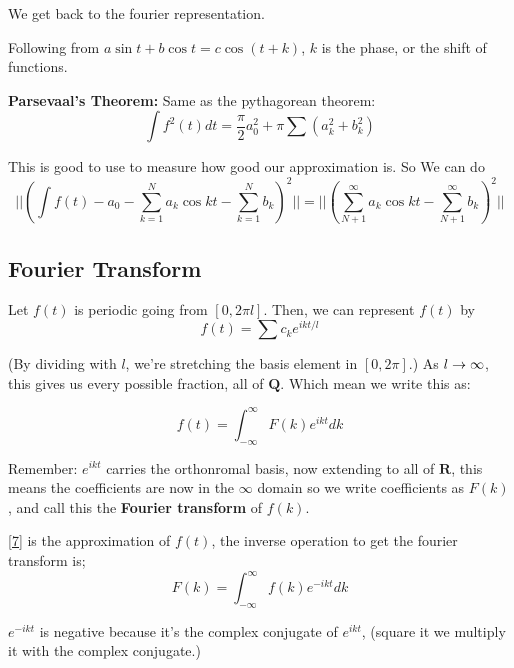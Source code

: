 We get back to the fourier representation.

Following from $a \sin t + b \cos t = c \cos (t + k)$, $k$ is the phase, or the shift
of functions.

\textbf{Parsevaal's Theorem:} Same as the pythagorean theorem:
$$\int f^2(t) dt = \frac{\pi}{2}a_0^2 + \pi\sum (a_k^2 + b_k^2)$$

This is good to use to measure how good our approximation is. 
So  
We can do $$
||(\int f(t) - a_0 -\sum_{k=1}^N a_k \cos kt - \sum_{k=1}^N
b_k)^2||  = ||(\sum_{N+1}^\infty a_k \cos kt - \sum_{N+1}^\infty b_k )^2||$$


\subsection{Fourier Transform}
\label{sec:fourier-transform-1}
Let $f(t)$ is periodic going from $[0, 2\pi l]$. Then, we can
represent $f(t)$ by
$$
  f(t)= \sum c_k e^{ikt/ l}
$$

(By dividing with $l$, we're stretching the basis element in $[0,
2\pi]$.) As $l\rightarrow \infty$, this gives us every possible fraction,
all of $\mathbf{Q}$. Which mean we write this as:

\begin{equation}
  \label{eq:7}
  f(t)= \int_{-\infty}^\infty F(k)e^{ikt}dk
\end{equation}

Remember: $e^{ikt}$ carries the orthonromal basis, now extending to
all of $\mathbf{R}$, this means the coefficients are now in the
$\infty$ domain so we write coefficients as $F(k)$, and call this the
\textbf{Fourier transform} of $f(k)$.

\eqref{7} is the approximation of $f(t)$, the inverse operation to get
the fourier transform is;
\begin{equation}
  \label{eq:9}
F(k) = \int_{-\infty}^\infty f(k)e^{-ikt}dk  
\end{equation}

$e^{-ikt}$ is negative because it's the complex conjugate of
$e^{ikt}$, (square it we multiply
it with the complex conjugate.)

 
